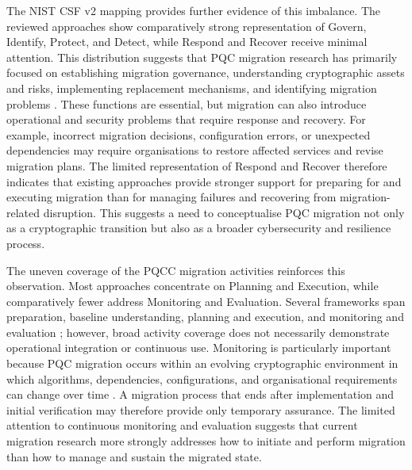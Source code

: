 \documentclass[letterpaper,twocolumn,10pt]{article}
\begin{document}
The NIST CSF v2 mapping provides further evidence of this imbalance. The reviewed approaches show comparatively strong representation of Govern, Identify, Protect, and Detect, while Respond and Recover receive minimal attention. This distribution suggests that PQC migration research has primarily focused on establishing migration governance, understanding cryptographic assets and risks, implementing replacement mechanisms, and identifying migration problems \cite{Ana_MigFrDepen, Ana_MigFrameOrg, Ana_PMMP, Ana_FinanceMig, Ana_rattanavipanon_toolchain_2025, Ana_e27020212}. These functions are essential, but migration can also introduce operational and security problems that require response and recovery. For example, incorrect migration decisions, configuration errors, or unexpected dependencies may require organisations to restore affected services and revise migration plans. The limited representation of Respond and Recover therefore indicates that existing approaches provide stronger support for preparing for and executing migration than for managing failures and recovering from migration-related disruption. This suggests a need to conceptualise PQC migration not only as a cryptographic transition but also as a broader cybersecurity and resilience process.

The uneven coverage of the PQCC migration activities \cite{pqcc_pqc_migration_roadmap_2025} reinforces this observation. Most approaches concentrate on Planning and Execution, while comparatively fewer address Monitoring and Evaluation. Several frameworks span preparation, baseline understanding, planning and execution, and monitoring and evaluation \cite{Ana_MigFrDepen, Ana_MigFrameOrg, Ana_FinanceMig}; however, broad activity coverage does not necessarily demonstrate operational integration or continuous use. Monitoring is particularly important because PQC migration occurs within an evolving cryptographic environment in which algorithms, dependencies, configurations, and organisational requirements can change over time \cite{naether_migrating_2024, migration_Comparison}. A migration process that ends after implementation and initial verification may therefore provide only temporary assurance. The limited attention to continuous monitoring and evaluation suggests that current migration research more strongly addresses how to initiate and perform migration than how to manage and sustain the migrated state.
\end{document}
